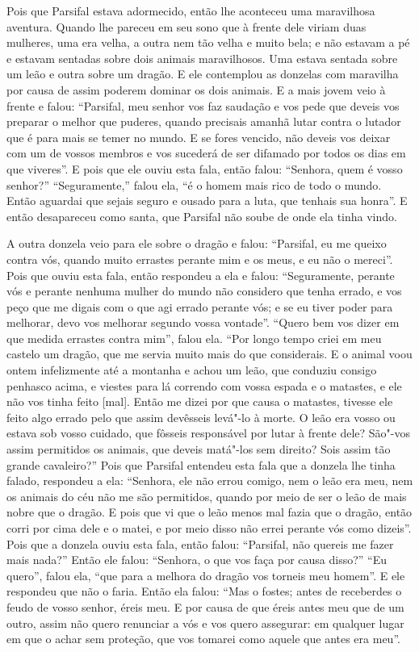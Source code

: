Pois que Parsifal estava adormecido, então lhe aconteceu uma maravilhosa
aventura. Quando lhe pareceu em seu sono que à frente dele viriam duas
mulheres, uma era velha, a outra nem tão velha e muito bela; e não estavam a pé
e estavam sentadas sobre dois animais maravilhosos. Uma estava sentada sobre um
leão e outra sobre um dragão. E ele contemplou as donzelas com maravilha por
causa de assim poderem dominar os dois animais. E a mais jovem veio à frente e
falou: “Parsifal, meu senhor vos faz saudação e vos pede que deveis vos
preparar  o melhor que puderes, quando precisais amanhã lutar contra o lutador
que é para mais se temer no mundo. E se fores vencido, não deveis vos deixar
com um de vossos membros e vos sucederá de ser difamado por todos os dias em
que viveres”. E pois que ele ouviu esta fala, então falou: “Senhora, quem é
vosso senhor?” “Seguramente,” falou ela, “é o homem mais rico de todo o mundo.
Então aguardai que sejais seguro e ousado para a luta, que tenhais sua honra”.
E então desapareceu como santa, que Parsifal não soube de onde ela tinha
vindo.

A outra donzela veio para ele sobre o dragão e falou: “Parsifal, eu me
queixo contra vós, quando muito errastes perante mim e os meus, e eu não o
mereci”. Pois que ouviu esta fala, então respondeu a ela e falou: “Seguramente,
perante vós e perante nenhuma mulher do mundo não considero que tenha errado, e
vos peço que me digais com o que agi errado perante vós; e se eu tiver poder
para melhorar, devo vos melhorar segundo vossa vontade”. “Quero bem vos dizer
em que medida errastes contra mim”, falou ela. “Por longo tempo criei em meu
castelo um dragão, que me servia muito mais do que considerais. E o animal voou
ontem infelizmente até a montanha e achou um leão, que conduziu consigo
penhasco acima, e viestes para lá correndo com vossa espada e o matastes, e ele
não vos tinha feito [mal]. Então me dizei por que causa o matastes, tivesse ele feito
algo errado pelo que assim devêsseis levá"-lo à morte. O leão era vosso ou
estava sob vosso cuidado, que fôsseis responsável por lutar à frente dele?
São"-vos assim permitidos os animais, que deveis matá"-los sem direito? Sois
assim tão grande cavaleiro?” Pois que Parsifal entendeu esta
fala que a donzela lhe tinha falado, respondeu a ela: “Senhora, ele não errou
comigo, nem o leão era meu, nem os animais do céu não me são permitidos, quando
por meio de ser o leão de mais nobre que o dragão. E pois que vi que o leão
menos mal fazia que o dragão, então corri por cima dele e o matei, e por meio
disso não errei perante vós como dizeis”. Pois que a donzela ouviu esta fala,
então falou: “Parsifal, não quereis me fazer mais nada?” Então ele falou:
“Senhora, o que vos faça por causa disso?'' “Eu quero”, falou ela, “que para a
melhora do dragão vos torneis meu homem”. E ele respondeu que não o faria.
Então ela falou: “Mas o fostes; antes de receberdes o feudo de vosso senhor,
éreis meu. E por causa de que éreis antes meu que de um outro, assim não quero
renunciar a vós e vos quero assegurar: em qualquer lugar em que o achar sem
proteção, que vos tomarei como aquele que antes era meu”. 

